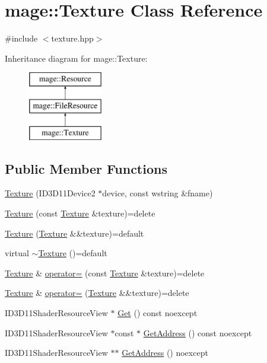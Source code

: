 \hypertarget{classmage_1_1_texture}{}\section{mage\+:\+:Texture Class Reference}
\label{classmage_1_1_texture}


{\ttfamily \#include $<$texture.\+hpp$>$}

Inheritance diagram for mage\+:\+:Texture\+:\begin{figure}[H]
\begin{center}
\leavevmode
\includegraphics[height=3.000000cm]{classmage_1_1_texture}
\end{center}
\end{figure}
\subsection*{Public Member Functions}
\begin{DoxyCompactItemize}
\item 
\hyperlink{classmage_1_1_texture_a680c4df56476b4c66c1e2ffd5bef63c2}{Texture} (I\+D3\+D11\+Device2 $\ast$device, const wstring \&fname)
\item 
\hyperlink{classmage_1_1_texture_aed9e8ab5bc3efdeb381672fd4e243ea7}{Texture} (const \hyperlink{classmage_1_1_texture}{Texture} \&texture)=delete
\item 
\hyperlink{classmage_1_1_texture_a9297257bfe76e744cb02bbbb51f73348}{Texture} (\hyperlink{classmage_1_1_texture}{Texture} \&\&texture)=default
\item 
virtual \hyperlink{classmage_1_1_texture_a81664804ac0259e8c67851409ee106fa}{$\sim$\+Texture} ()=default
\item 
\hyperlink{classmage_1_1_texture}{Texture} \& \hyperlink{classmage_1_1_texture_a0b73b4df98d729c8f60e58b0ca065636}{operator=} (const \hyperlink{classmage_1_1_texture}{Texture} \&texture)=delete
\item 
\hyperlink{classmage_1_1_texture}{Texture} \& \hyperlink{classmage_1_1_texture_a765e9cf3bddedbe2795dea0fe57245ff}{operator=} (\hyperlink{classmage_1_1_texture}{Texture} \&\&texture)=delete
\item 
I\+D3\+D11\+Shader\+Resource\+View $\ast$ \hyperlink{classmage_1_1_texture_ac48cd0477d9771666e3929d72ee4e419}{Get} () const noexcept
\item 
I\+D3\+D11\+Shader\+Resource\+View $\ast$const  $\ast$ \hyperlink{classmage_1_1_texture_a35bde0f3a226f261d82fb3dd792631ad}{Get\+Address} () const noexcept
\item 
I\+D3\+D11\+Shader\+Resource\+View $\ast$$\ast$ \hyperlink{classmage_1_1_texture_a4f64ce2ddf3cee7283613e9dbb137e23}{Get\+Address} () noexcept
\end{DoxyCompactItemize}
